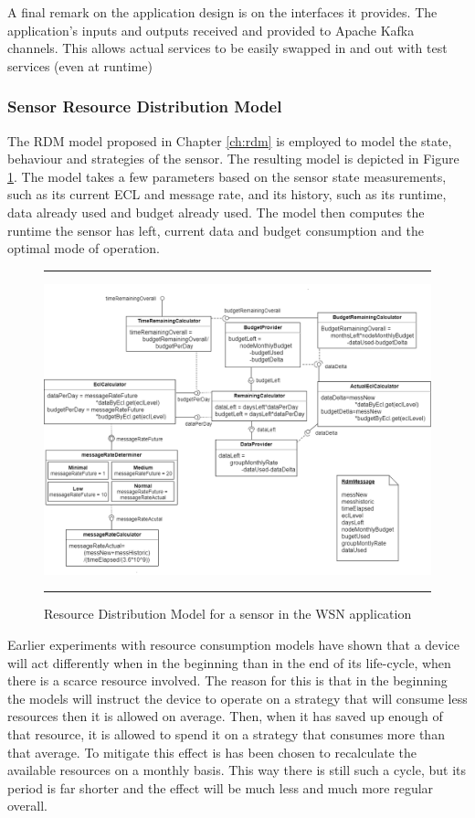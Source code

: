 A final remark on the application design is on the interfaces it provides. The application's inputs and outputs received and provided to Apache Kafka channels. This allows actual services to be easily swapped in and out with test services (even at runtime)

\subsubsection{Sensor Resource Distribution Model}
The RDM model proposed in Chapter \ref{ch:rdm} is employed to model the state, behaviour and strategies of the sensor. The resulting model is depicted in Figure \ref{fig:sensit_rdm}. The model takes a few parameters based on the sensor state measurements, such as its current ECL and message rate, and its history, such as its runtime, data already used and budget already used. The model then computes the runtime the sensor has left, current data and budget consumption and the optimal mode of operation.

\begin{figure}
\centering
\hrule
\includegraphics[width=\textwidth]{resources/img/sensit_rdm.png}
\hrule
\caption{Resource Distribution Model for a sensor in the \idsystems\sensit WSN application}
\label{fig:sensit_rdm}
\end{figure}

Earlier experiments with resource consumption models have shown that a device will act differently when in the beginning than in the end of its life-cycle, when there is a scarce resource involved. The reason for this is that in the beginning the models will instruct the device to operate on a strategy that will consume less resources then it is allowed on average. Then, when it has saved up enough of that resource, it is allowed to spend it on a strategy that consumes more than that average. To mitigate this effect is has been chosen to recalculate the available resources on a monthly basis. This way there is still such a cycle, but its period is far shorter and the effect will be much less and much more regular overall.

